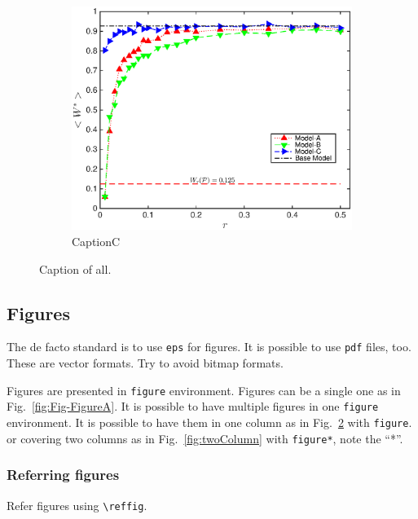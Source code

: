 \documentclass[pre,twocolumn,showkeys,longbibliography]{revtex4-1}
\newcommand{\reffig}[1]{Fig.~\ref{#1}}
\newcommand{\hCode}[1]{\texttt{#1}}
\theoremstyle{plain}
\theoremstyle{definition}
\theoremstyle{remark}
\begin{document}
\begin{figure}[!tbp]
\begin{subfigure}{\columnwidth}
		\includegraphics[width=\columnwidth]
			{Fig-FigureC}
		\caption{CaptionC} 
		\label{fig:figureC}
	\end{subfigure}
	\caption{
		Caption of all.
	} %
	\label{fig:oneColumn}
\end{figure}




\subsection{Figures}

The de facto standard is to use \hCode{eps} for figures.
It is possible to use \hCode{pdf} files, too.
These are vector formats.
Try to avoid bitmap formats.

Figures are presented in \hCode{figure} environment.
Figures can be a single one as in \reffig{fig:Fig-FigureA}.
It is possible to have multiple figures in one \hCode{figure} environment.
It is possible to have them in one column as in \reffig{fig:oneColumn} with \hCode{figure}.
or covering two columns as in \reffig{fig:twoColumn} with \hCode{figure*},
note the ``*''.




\subsubsection{Referring figures}

Refer figures using \verb!\reffig!.
\end{document}
